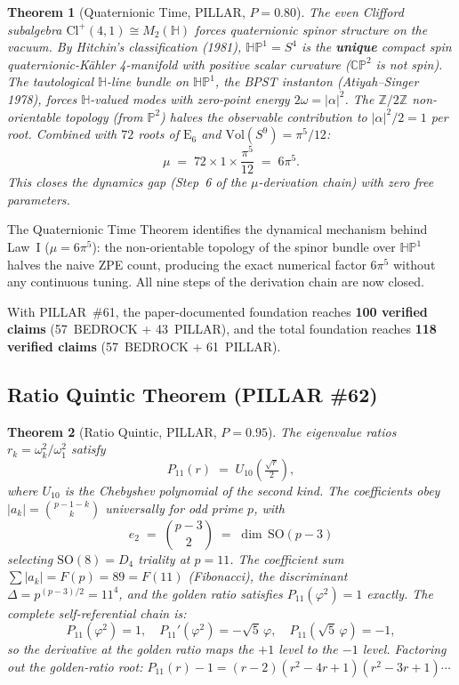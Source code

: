 \documentclass[aps,prd,twocolumn,superscriptaddress,floatfix,nofootinbib]{revtex4-2}
\newtheorem{theorem}{Theorem}
\theoremstyle{definition}
\theoremstyle{remark}
\begin{document}
\begin{theorem}[Quaternionic Time, PILLAR, $P{=}0.80$]
\label{thm:quaternionic-time}
The even Clifford subalgebra $\mathrm{Cl}^+(4,1) \cong M_2(\mathbb{H})$ forces
quaternionic spinor structure on the vacuum.  By Hitchin's classification
(1981), $\mathbb{HP}^1 = S^4$ is the \textbf{unique} compact spin
quaternionic-K\"{a}hler 4-manifold with positive scalar curvature ($\mathbb{CP}^2$
is not spin).  The tautological $\mathbb{H}$-line bundle on $\mathbb{HP}^1$, the
BPST instanton (Atiyah--Singer 1978), forces $\mathbb{H}$-valued modes with
zero-point energy $2\omega = |\alpha|^2$.  The $\mathbb{Z}/2\mathbb{Z}$
non-orientable topology (from $\mathbb{P}^2$) halves the observable contribution
to $|\alpha|^2/2 = 1$ per root.  Combined with $72$ roots of $\mathrm{E}_6$ and
$\mathrm{Vol}(S^9) = \pi^5/12$:
\[
\mu \;=\; 72 \times 1 \times \frac{\pi^5}{12} \;=\; 6\pi^5.
\]
This closes the dynamics gap (Step~6 of the $\mu$-derivation chain) with zero
free parameters.
\end{theorem}

\noindent
The Quaternionic Time Theorem identifies the dynamical mechanism behind Law~I
($\mu = 6\pi^5$): the non-orientable topology of the spinor bundle over
$\mathbb{HP}^1$ halves the naive ZPE count, producing the exact numerical
factor $6\pi^5$ without any continuous tuning.  All nine steps of the
derivation chain are now closed.

\noindent
With PILLAR~\#61, the paper-documented foundation reaches
\textbf{100 verified claims} (57~BEDROCK + 43~PILLAR), and the total foundation
reaches \textbf{118 verified claims} (57~BEDROCK + 61~PILLAR).

\subsection{Ratio Quintic Theorem (PILLAR \#62)}
\label{sec:ratio-quintic}

\begin{theorem}[Ratio Quintic, PILLAR, $P{=}0.95$]
\label{thm:ratio-quintic}
The eigenvalue ratios $r_k = \omega_k^2/\omega_1^2$ satisfy
\[
P_{11}(r) \;=\; U_{10}\!\left(\tfrac{\sqrt{r}}{2}\right),
\]
where $U_{10}$ is the Chebyshev polynomial of the second kind.  The
coefficients obey $|a_k| = \binom{p-1-k}{k}$ universally for odd prime
$p$, with
\[
e_2 \;=\; \binom{p-3}{2} \;=\; \dim\,\mathrm{SO}(p-3)
\]
selecting $\mathrm{SO}(8) = D_4$ triality at $p=11$.  The coefficient
sum $\sum|a_k| = F(p) = 89 = F(11)$ (Fibonacci), the discriminant
$\Delta = p^{(p-3)/2} = 11^4$, and the golden ratio satisfies
$P_{11}(\varphi^2) = 1$ exactly.  The complete self-referential chain is:
\[
P_{11}(\varphi^2) = 1, \quad
P_{11}'(\varphi^2) = -\sqrt{5}\,\varphi, \quad
P_{11}(\sqrt{5}\,\varphi) = -1,
\]
so the derivative at the golden ratio maps the $+1$ level to the $-1$
level.  Factoring out the golden-ratio root:
$P_{11}(r)-1 = (r-2)(r^2-4r+1)(r^2-3r+1)\cdots$
\end{theorem}
\end{document}
